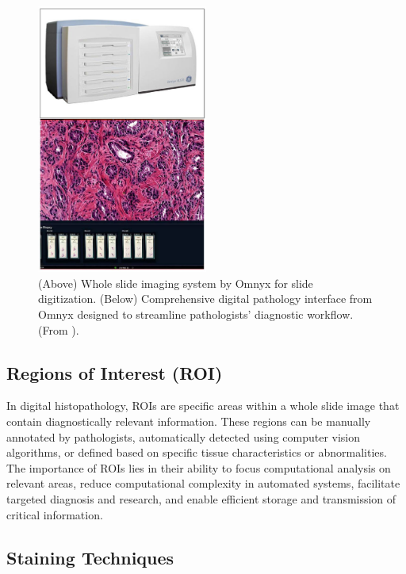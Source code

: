 \begin{figure}[h]
  \centering
  \includegraphics[width=0.5\textwidth]{Cap2/Figures/hist_scanner.jpg}
  \caption{(Above) Whole slide imaging system by Omnyx for slide
    digitization. (Below) Comprehensive digital pathology interface
    from Omnyx designed to streamline pathologists' diagnostic
  workflow. (From \cite{FarahaniEtAl2015}).}
  \label{fig:wsi}
\end{figure}

\subsection{Regions of Interest (ROI)}

In digital histopathology, \glspl{ROI} are specific areas within a
whole slide image that contain diagnostically relevant information.
These regions can be manually annotated by pathologists,
automatically detected using computer vision algorithms, or defined
based on specific tissue characteristics or abnormalities. The
importance of \glspl{ROI} lies in their ability to focus
computational analysis on relevant areas, reduce computational
complexity in automated systems, facilitate targeted diagnosis and
research, and enable efficient storage and transmission of critical information.

\subsection{Staining Techniques}\label{sec:staining_techniques}

